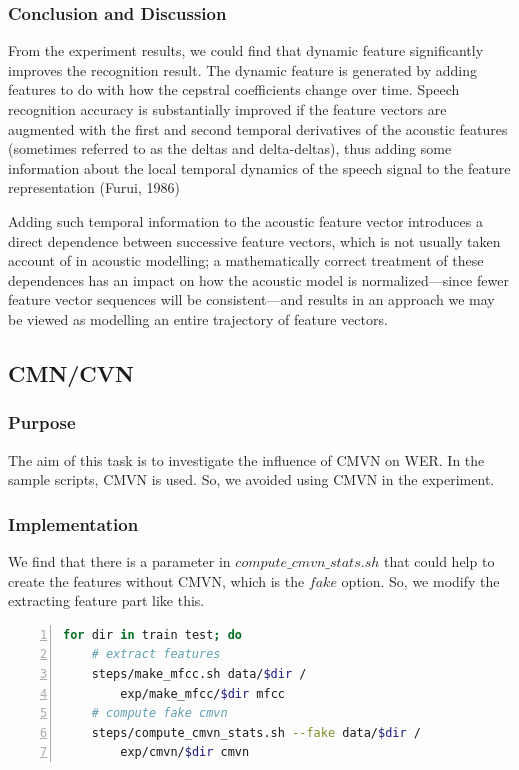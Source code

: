 \documentclass[]{article}
\begin{document}
\begin{multicols*}{2}
\subsubsection{Conclusion and Discussion}
From the experiment results, we could find that dynamic feature significantly improves the recognition result. The dynamic feature is generated by adding features to do with how the cepstral coefficients change over time. Speech recognition accuracy is substantially improved if the feature vectors are augmented with the first and second temporal derivatives of the acoustic features (sometimes referred to as the deltas and delta-deltas), thus adding some information about the local temporal dynamics of the speech signal to the feature representation (Furui, 1986)

Adding such temporal information to the acoustic feature vector introduces a direct dependence between successive feature vectors, which is not usually taken account of in acoustic modelling; a mathematically correct treatment of these dependences has an impact on how the acoustic model is normalized—since fewer feature vector sequences will be consistent—and results in an approach we may be viewed as modelling an entire trajectory of feature vectors.

\subsection{CMN/CVN}
\subsubsection{Purpose}
The aim of this task is to investigate the influence of CMVN on WER. In the sample scripts, CMVN is used. So, we avoided using CMVN in the experiment.
\subsubsection{Implementation}
We find that there is a parameter in $compute\_cmvn\_stats.sh$ that could help to create the features without CMVN, which is the $fake$ option. So, we modify the extracting feature part like this.
\begin{lstlisting}[language=sh,showstringspaces=false,numbers=left,tabsize=4, xleftmargin=\parindent, frame=single, basicstyle=\tiny] 
for dir in train test; do
	# extract features
	steps/make_mfcc.sh data/$dir /
		exp/make_mfcc/$dir mfcc
	# compute fake cmvn
	steps/compute_cmvn_stats.sh --fake data/$dir /
		exp/cmvn/$dir cmvn
\end{lstlisting}


\end{multicols*}
\end{document}
